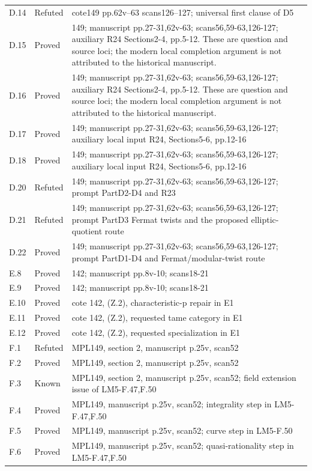{\begin{longtable}{p{1.9cm}p{1.7cm}p{10.3cm}}
D.14 & Refuted & cote149 pp.62v--63 scans126--127; universal first clause of D5 \\
D.15 & Proved & 149; manuscript pp.27-31,62v-63; scans56,59-63,126-127; auxiliary R24 Sections2-4, pp.5-12. These are question and source loci; the modern local completion argument is not attributed to the historical manuscript. \\
D.16 & Proved & 149; manuscript pp.27-31,62v-63; scans56,59-63,126-127; auxiliary R24 Sections2-4, pp.5-12. These are question and source loci; the modern local completion argument is not attributed to the historical manuscript. \\
D.17 & Proved & 149; manuscript pp.27-31,62v-63; scans56,59-63,126-127; auxiliary local input R24, Sections5-6, pp.12-16 \\
D.18 & Proved & 149; manuscript pp.27-31,62v-63; scans56,59-63,126-127; auxiliary local input R24, Sections5-6, pp.12-16 \\
D.20 & Refuted & 149; manuscript pp.27-31,62v-63; scans56,59-63,126-127; prompt PartD2-D4 and R23 \\
D.21 & Refuted & 149; manuscript pp.27-31,62v-63; scans56,59-63,126-127; prompt PartD3 Fermat twists and the proposed elliptic-quotient route \\
D.22 & Proved & 149; manuscript pp.27-31,62v-63; scans56,59-63,126-127; prompt PartD1-D4 and Fermat/modular-twist route \\
E.8 & Proved & 142; manuscript pp.8v-10; scans18-21 \\
E.9 & Proved & 142; manuscript pp.8v-10; scans18-21 \\
E.10 & Proved & cote 142, (Z.2), characteristic-p repair in E1 \\
E.11 & Proved & cote 142, (Z.2), requested tame category in E1 \\
E.12 & Proved & cote 142, (Z.2), requested specialization in E1 \\
F.1 & Refuted & MPL149, section 2, manuscript p.25v, scan52 \\
F.2 & Proved & MPL149, section 2, manuscript p.25v, scan52 \\
F.3 & Known & MPL149, section 2, manuscript p.25v, scan52; field extension issue of LM5-F.47,F.50 \\
F.4 & Proved & MPL149, manuscript p.25v, scan52; integrality step in LM5-F.47,F.50 \\
F.5 & Proved & MPL149, manuscript p.25v, scan52; curve step in LM5-F.50 \\
F.6 & Proved & MPL149, manuscript p.25v, scan52; quasi-rationality step in LM5-F.47,F.50 \\

\end{longtable}}
